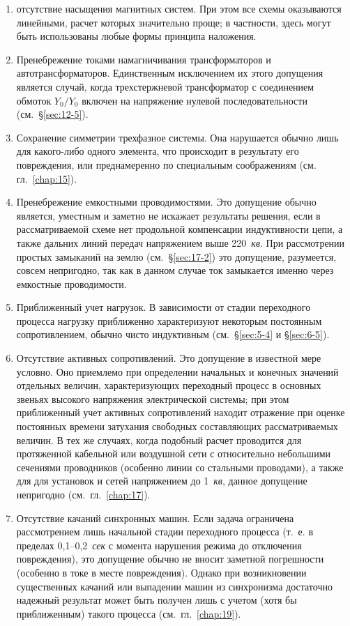 \begin{enumerate} 
	\item
	отсутствие насыщения магнитных систем. При этом все схемы оказываются линейными, расчет которых значительно проще; в частности, здесь могут быть использованы любые формы принципа наложения.
	\item
	Пренебрежение токами намагничивания трансформаторов и автотрансформаторов. Единственным исключением их этого допущения является случай, когда трехстержневой трансформатор с соединением обмоток $ Y_{0}/Y_{0} $ включен на напряжение нулевой последовательности (см.~§\ref{sec:12-5}).
	\item
	Сохранение симметрии трехфазное системы. Она нарушается обычно лишь для какого-либо одного элемента, что происходит в результату его повреждения, или преднамеренно по специальным соображениям (см. гл.~\ref{chap:15}).
	\item
	Пренебрежение емкостными проводимостями. Это допущение обычно является, уместным и заметно не искажает результаты решения, если в рассматриваемой схеме нет продольной компенсации индуктивности цепи, а также дальних линий передач напряжением выше 220~\textit{кв}. При рассмотрении простых замыканий на землю (см.~§\ref{sec:17-2}) это допущение, разумеется, совсем непригодно, так как в данном случае ток замыкается именно через емкостные проводимости.
	\item
	Приближенный учет нагрузок. В зависимости от стадии переходного процесса нагрузку приближенно характеризуют некоторым постоянным сопротивлением, обычно чисто индуктивным (см.~§\ref{sec:5-4} и §\ref{sec:6-5}).
	\item
	Отсутствие активных сопротивлений. Это допущение в известной мере условно. Оно приемлемо при определении начальных и конечных значений отдельных величин, характеризующих переходный процесс в основных звеньях высокого напряжения электрической системы; при этом приближенный учет активных сопротивлений находит отражение при оценке постоянных времени затухания свободных составляющих рассматриваемых величин. В тех же случаях, когда подобный расчет проводится для протяженной кабельной или воздушной сети с относительно небольшими сечениями проводников (особенно линии со стальными проводами), а также для для установок и сетей напряжением до 1~\textit{кв}, данное допущение непригодно (см.~гл.~\ref{chap:17}).
	\item
	Отсутствие качаний синхронных машин. Если задача ограничена рассмотрением лишь начальной стадии переходного процесса (т.~е. в пределах 0,1--0,2~\textit{сек} с момента нарушения режима до отключения повреждения), это допущение обычно не вносит заметной погрешности (особенно в токе в месте повреждения). Однако при возникновении существенных качаний или выпадении машин из синхронизма достаточно надежный результат может быть получен лишь с учетом (хотя бы приближенным) такого процесса (см.~гл.~\ref{chap:19}).
\end{enumerate}

